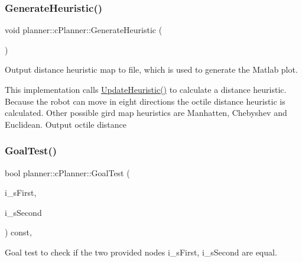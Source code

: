 \mbox{\label{classplanner_1_1c_planner_a1a4650050656545744796296a653d388}} 
\subsubsection{\texorpdfstring{Generate\+Heuristic()}{GenerateHeuristic()}}
{\footnotesize\ttfamily void planner\+::c\+Planner\+::\+Generate\+Heuristic (\begin{DoxyParamCaption}{ }\end{DoxyParamCaption})}



Output distance heuristic map to file, which is used to generate the Matlab plot. 

This implementation calls \mbox{\hyperlink{classplanner_1_1c_planner_ad32a7c58b885456ced172b66fed854f0}{Update\+Heuristic()}} to calculate a distance heuristic. Because the robot can move in eight directions the octile distance heuristic is calculated. Other possible gird map heuristics are Manhatten, Chebyshev and Euclidean. Output octile distance \mbox{\label{classplanner_1_1c_planner_a8b241ebd7bb3bde3dd062c50a2a42339}} 
\subsubsection{\texorpdfstring{Goal\+Test()}{GoalTest()}}
{\footnotesize\ttfamily bool planner\+::c\+Planner\+::\+Goal\+Test (\begin{DoxyParamCaption}\item[{const \mbox{\hyperlink{structplanner_1_1t_node}{t\+Node}} $\ast$}]{i\+\_\+s\+First,  }\item[{const \mbox{\hyperlink{structplanner_1_1t_node}{t\+Node}} $\ast$}]{i\+\_\+s\+Second }\end{DoxyParamCaption}) const\hspace{0.3cm}{\ttfamily [override]}, {\ttfamily [virtual]}}



Goal test to check if the two provided nodes i\+\_\+s\+First, i\+\_\+s\+Second are equal. 


